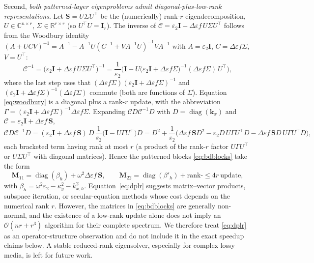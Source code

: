 \documentclass[11pt]{article}
\theoremstyle{remark}
\newcommand{\CC}{\mathbb{C}}
\newcommand{\eps}{\varepsilon}
\newcommand{\Cmat}{\mathcal{C}}
\newcommand{\kk}{\mathbf{k}}
\newcommand{\Id}{\mathbf{I}}
\DeclareMathOperator{\diag}{diag}
\newcommand{\R}{\mathbb{R}}
\newcommand{\order}{\mathcal{O}}
\begin{document}
Second, \emph{both patterned-layer eigenproblems admit
diagonal-plus-low-rank representations}.
Let $\mathbf{S}=U\Sigma U^{\top}$ be the (numerically) rank-$r$
eigendecomposition, $U\in\CC^{n\times r}$, $\Sigma\in\R^{r\times r}$
(so $U^{\top}U=\Id_r$).  The inverse of
$\Cmat=\varepsilon_2\Id+\Delta\eps f\,U\Sigma U^{\top}$ follows from the
Woodbury identity $(A+UCV)^{-1}=A^{-1}-A^{-1}U(C^{-1}+VA^{-1}U)^{-1}VA^{-1}$
with $A=\varepsilon_2\Id$, $C=\Delta\eps f\Sigma$, $V=U^{\top}$:
\begin{equation}
\Cmat^{-1}=\big(\varepsilon_2\Id+\Delta\eps f\,U\Sigma U^{\top}\big)^{-1}
=\frac{1}{\varepsilon_2}\Big(\Id-U\big(\varepsilon_2\Id+\Delta\eps f\Sigma\big)^{-1}
(\Delta\eps f\Sigma)\,U^{\top}\Big),
\label{eq:woodbury}
\end{equation}
where the last step uses that $(\Delta\eps f\Sigma)(\varepsilon_2\Id+\Delta\eps
f\Sigma)^{-1}$ and $(\varepsilon_2\Id+\Delta\eps f\Sigma)^{-1}(\Delta\eps f\Sigma)$
commute (both are functions of $\Sigma$).  Equation \eqref{eq:woodbury} is a
diagonal plus a rank-$r$ update, with the abbreviation
$\Gamma=(\varepsilon_2\Id+\Delta\eps f\Sigma)^{-1}\Delta\eps f\Sigma$.
Expanding $\Cmat D\Cmat^{-1}D$ with $D=\diag(\kk_x)$ and $\Cmat=\varepsilon_2\Id+
\Delta\eps f\,\mathbf{S}$,
\begin{equation}
\Cmat D\Cmat^{-1}D
=(\varepsilon_2\Id+\Delta\eps f\,\mathbf{S})\,D\,
\frac{1}{\varepsilon_2}\big(\Id-U\Gamma U^{\top}\big)D
=D^2+\frac{1}{\varepsilon_2}\Big(\Delta\eps f\,\mathbf{S}D^2
-\varepsilon_2 D\,U\Gamma U^{\top}D-\Delta\eps f\,\mathbf{S}D\,U\Gamma U^{\top}D\Big),
\label{eq:cdcd}
\end{equation}
each bracketed term having rank at most $r$ (a product of the rank-$r$ factor
$U\Gamma U^{\top}$ or $U\Sigma U^{\top}$ with diagonal matrices). Hence the
patterned blocks \eqref{eq:bdblocks} take the form
\begin{equation}
\mathbf{M}_{11}=\diag(\beta_h)+\omega^2\Delta\eps f\,\mathbf{S},\qquad
\mathbf{M}_{22}=\diag(\beta'_h)+\text{rank-}\le4r\ \text{update},
\label{eq:dplr}
\end{equation}
with $\beta_h=\omega^2\varepsilon_2-\kappa_y^2-k_{x,h}^2$.
Equation~\eqref{eq:dplr} suggests matrix--vector products, subspace iteration,
or secular-equation methods whose cost depends on the numerical rank $r$.
However, the matrices in \eqref{eq:bdblocks} are generally non-normal, and the
existence of a low-rank update alone does not imply an
$\order(nr+r^3)$ algorithm for their complete spectrum.  We therefore treat
\eqref{eq:dplr} as an operator-structure observation and do not include it in
the exact speedup claims below.  A stable reduced-rank eigensolver, especially
for complex lossy media, is left for future work.
\end{document}
